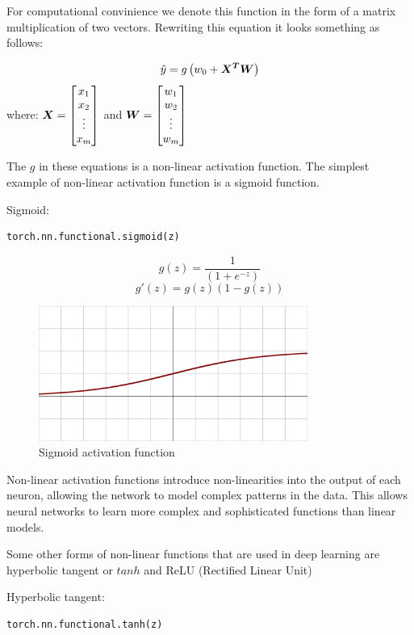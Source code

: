 \documentclass{report}
\begin{document}
For computational convinience we denote this function in the form of a matrix multiplication of two vectors. Rewriting this equation it looks something as follows:

$$\hat{y} = g \left( w_0 + \boldsymbol{X^T W} \right)$$
where: $\boldsymbol{X} = \begin{bmatrix}x_1 \\ x_2 \\ \vdots \\ x_m \end{bmatrix}$
and $\boldsymbol{W} = \begin{bmatrix}w_1 \\ w_2 \\ \vdots \\ w_m \end{bmatrix}$

The $g$ in these equations is a non-linear activation function. The simplest example of non-linear activation function is a sigmoid function.

Sigmoid:

\begin{verbatim}
torch.nn.functional.sigmoid(z)
\end{verbatim}

$$g(z) = \frac{1}{(1+e^{-z})}$$
$$g'(z) = g(z)(1-g(z))$$

\begin{figure}[ht]
	\includegraphics[width=250pt]{2}
	\centering
	\caption{Sigmoid activation function}
\end{figure}

Non-linear activation functions introduce non-linearities into the output of each neuron, allowing the network to model complex patterns in the data. This allows neural networks to learn more complex and sophisticated functions than linear models.

Some other forms of non-linear functions that are used in deep learning are hyperbolic tangent or $tanh$ and ReLU (Rectified Linear Unit)

Hyperbolic tangent:

\begin{verbatim}
torch.nn.functional.tanh(z)
\end{verbatim}
\end{document}
